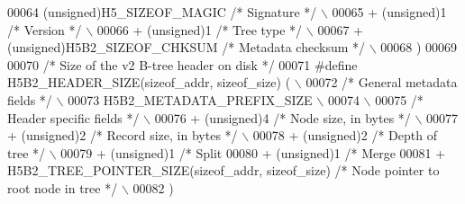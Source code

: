 \begin{DoxyCode}
00064 \textcolor{preprocessor}{    (unsigned)H5\_SIZEOF\_MAGIC   }\textcolor{comment}{/* Signature */}\textcolor{preprocessor}{                               \(\backslash\)}
00065 \textcolor{preprocessor}{    + (unsigned)1 }\textcolor{comment}{/* Version */}\textcolor{preprocessor}{                                               \(\backslash\)}
00066 \textcolor{preprocessor}{    + (unsigned)1 }\textcolor{comment}{/* Tree type */}\textcolor{preprocessor}{                                             \(\backslash\)}
00067 \textcolor{preprocessor}{    + (unsigned)H5B2\_SIZEOF\_CHKSUM }\textcolor{comment}{/* Metadata checksum */}\textcolor{preprocessor}{                    \(\backslash\)}
00068 \textcolor{preprocessor}{    )}
00069 
00070 \textcolor{comment}{/* Size of the v2 B-tree header on disk */}
00071 \textcolor{preprocessor}{#define H5B2\_HEADER\_SIZE(sizeof\_addr, sizeof\_size)   (                        \(\backslash\)}
00072 \textcolor{preprocessor}{    }\textcolor{comment}{/* General metadata fields */}\textcolor{preprocessor}{                                             \(\backslash\)}
00073 \textcolor{preprocessor}{    H5B2\_METADATA\_PREFIX\_SIZE                                                 \(\backslash\)}
00074 \textcolor{preprocessor}{                                                                              \(\backslash\)}
00075 \textcolor{preprocessor}{    }\textcolor{comment}{/* Header specific fields */}\textcolor{preprocessor}{                                              \(\backslash\)}
00076 \textcolor{preprocessor}{    + (unsigned)4 }\textcolor{comment}{/* Node size, in bytes */}\textcolor{preprocessor}{                                   \(\backslash\)}
00077 \textcolor{preprocessor}{    + (unsigned)2 }\textcolor{comment}{/* Record size, in bytes */}\textcolor{preprocessor}{                                 \(\backslash\)}
00078 \textcolor{preprocessor}{    + (unsigned)2 }\textcolor{comment}{/* Depth of tree */}\textcolor{preprocessor}{                                         \(\backslash\)}
00079 \textcolor{preprocessor}{    + (unsigned)1 }\textcolor{comment}{/* Split %
00080 \textcolor{preprocessor}{    + (unsigned)1 }\textcolor{comment}{/* Merge %
00081 \textcolor{preprocessor}{    + H5B2\_TREE\_POINTER\_SIZE(sizeof\_addr, sizeof\_size)  }\textcolor{comment}{/* Node pointer to root node in tree */}\textcolor{preprocessor}{ \(\backslash\)}
00082 \textcolor{preprocessor}{    )}
}}
\end{DoxyCode}
